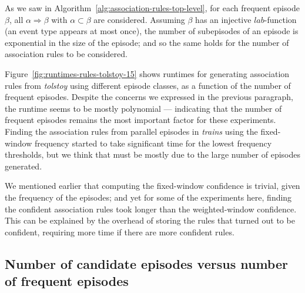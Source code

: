 As we saw in Algorithm~\ref{alg:association-rules-top-level}, for each frequent episode $ \beta $, all $ \alpha \Rightarrow \beta $ with $ \alpha \subset \beta $ are considered. Assuming $ \beta $ has an injective $ lab $-function (an event type appears at most once), the number of subepisodes of an episode is exponential in the size of the episode; and so the same holds for the number of association rules to be considered.

Figure~\ref{fig:runtimes-rules-tolstoy-15} shows runtimes for generating association rules from \emph{tolstoy} using different episode classes, as a function of the number of frequent episodes. Despite the concerns we expressed in the previous paragraph, the runtime seems to be mostly polynomial --- indicating that the number of frequent episodes remains the most important factor for these experiments. Finding the association rules from parallel episodes in \emph{trains} using the fixed-window frequency started to take significant time for the lowest frequency thresholds, but we think that must be mostly due to the large number of episodes generated.

We mentioned earlier that computing the fixed-window confidence is trivial, given the frequency of the episodes; and yet for some of the experiments here, finding the confident association rules took longer than the weighted-window confidence. This can be explained by the overhead of storing the rules that turned out to be confident, requiring more time if there are  more confident rules.

\iffalse
\subsection{Number of candidate episodes versus number of frequent episodes}


